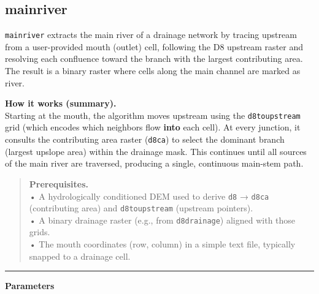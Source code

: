 \documentclass[
]{book}
\begin{document}
\subsection{mainriver}\label{mainriver}

\texttt{mainriver} extracts the main river of a drainage network by tracing upstream from a user-provided mouth (outlet) cell, following the D8 upstream raster and resolving each confluence toward the branch with the largest contributing area. The result is a binary raster where cells along the main channel are marked as river.

\textbf{How it works (summary).}\\
Starting at the mouth, the algorithm moves upstream using the \texttt{d8toupstream} grid (which encodes which neighbors flow \textbf{into} each cell). At every junction, it consults the contributing area raster (\texttt{d8ca}) to select the dominant branch (largest upslope area) within the drainage mask. This continues until all sources of the main river are traversed, producing a single, continuous main-stem path.

\begin{quote}
\textbf{Prerequisites.}\\
• A hydrologically conditioned DEM used to derive \texttt{d8} → \texttt{d8ca} (contributing area) and \texttt{d8toupstream} (upstream pointers).\\
• A binary drainage raster (e.g., from \texttt{d8drainage}) aligned with those grids.\\
• The mouth coordinates (row, column) in a simple text file, typically snapped to a drainage cell.
\end{quote}

\begin{center}\rule{0.5\linewidth}{0.5pt}\end{center}

\textbf{Parameters}
\end{document}
